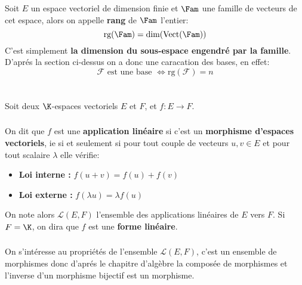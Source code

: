 \subsection*{}
Soit \(E\) un espace vectoriel de dimension finie et \(\Fam\) une famille de vecteurs de cet espace, alors on appelle \textbf{rang} de \(\Fam\) l'entier:
\[ 
   \text{rg}(\Fam) = \text{dim}(\text{Vect}(\Fam))
\]
C'est simplement \textbf{la dimension du sous-espace engendré par la famille}. D'aprés la section ci-dessus on a donc une caracation des bases, en effet:
\[ 
   \mathscr{F} \text{ est une base } \iff \text{rg}(\mathscr{F}) = n 
\]
\chapter*{} %

Soit deux \(\K\)-espaces vectoriels \(E\) et \(F\), et \(f : E \longrightarrow F \).

\subsection*{}

On dit que \(f\) est une \textbf{application linéaire} si c'est un \textbf{morphisme d'espaces vectoriels}, ie si et seulement si pour tout couple de vecteurs \(u, v \in E\) et pour tout scalaire \(\lambda\) elle vérifie: 
\begin{itemize}
   \item \textbf{ Loi  interne : } \( f(u + v) = f(u) + f(v) \)
   \item \textbf{ Loi  externe : } \( f(\lambda u) = \lambda f(u) \)
\end{itemize}
On note alors \(\mathcal{L}(E, F)\) l'ensemble des applications linéaires de \(E\) vers \(F\). Si \( F = \K \), on dira que \( f \) est une \textbf{forme linéaire}.
\subsection*{}

On s'intéresse au propriétés de l'ensemble \(\mathcal{L}(E, F)\), c'est un ensemble de morphismes donc d'aprés le chapitre d'algèbre la composée de morphismes et l'inverse d'un morphisme bijectif est un morphisme.\<

